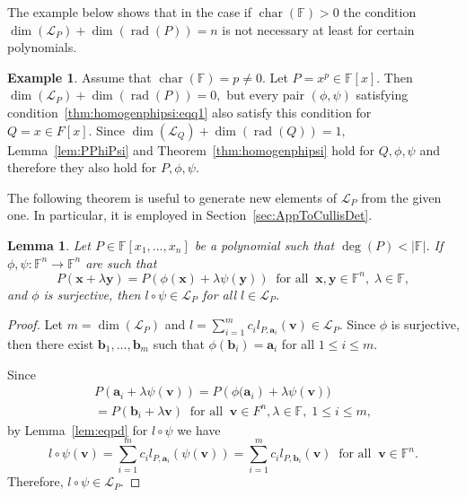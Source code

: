 \documentclass{elsarticle}
\DeclareMathOperator{\Char}{char}
\DeclareMathOperator{\rad}{rad}
\def\F{{\mathbb F}}
\newtheorem{lemma}[theorem]{Lemma}
\theoremstyle{definition}
\newtheorem{example}[theorem]{Example}
\numberwithin{equation}{section}
\begin{document}
The example below shows that in the case if $\Char (\F) > 0$ the condition $\dim (\mathcal L_P) + \dim (\rad(P)) = n$ is not necessary at least for certain polynomials.

\begin{example}\label{ex:conditionsretained}Assume that $\Char (\F) = p \neq 0$. Let $P = x^p \in \F[x].$ Then $\dim (\mathcal L_P) + \dim (\rad(P)) = 0,$ but every pair $(\phi, \psi)$ satisfying condition~\ref{thm:homogenphipsi:eqq1} also satisfy this condition for $Q = x \in F[x].$ Since $\dim (\mathcal L_Q) + \dim (\rad(Q)) = 1,$ Lemma~\ref{lem:PPhiPsi} and Theorem~\ref{thm:homogenphipsi} hold for $Q, \phi, \psi$ and therefore they also hold for $P, \phi, \psi.$
\end{example}


The following theorem is useful to generate new elements of $\mathcal L_P$ from the given one. In particular, it is employed in Section~\ref{sec:AppToCullisDet}.%

\begin{lemma}\label{thm:surjpres}Let $P \in \F[x_1,\ldots, x_n]$ be a polynomial such that $\deg (P) < |\F|$. If  $\phi, \psi \colon \F^n \to \F^n$ are such that
\begin{equation*}
P(\mathbf{x} + \lambda \mathbf{y}) = P(\phi(\mathbf{x}) + \lambda \psi(\mathbf{y}))\;\;\mbox{for all}\;\;\mathbf{x},\mathbf{y} \in \mathbb \F^n,\; \lambda \in \F,
\end{equation*}
and $\phi$ is surjective, then $l \circ \psi \in \mathcal L_P$ for all $l \in \mathcal L_P.$
\end{lemma}

\begin{proof}Let $m = \dim(\mathcal L_P)$ and $l = \sum_{i=1}^m c_i l_{P, \mathbf a_i}(\mathbf{v}) \in \mathcal L_P.$ Since $\phi$ is surjective, then there exist $\mathbf{b}_1, \ldots, \mathbf{b}_m$ such that $\phi (\mathbf{b}_i) = \mathbf{a}_i$ for all $1 \le i \le m.$

Since
\begin{multline*}
P(\mathbf a_i + \lambda \psi(\mathbf v)) = P(\phi \mathbf (\mathbf a_i) + \lambda \psi (\mathbf v))\\
 = P(\mathbf b_i + \lambda \mathbf v)\;\;\mbox{for all}\;\;\mathbf v \in F^n, \lambda \in \F,\;1 \le i \le m,
\end{multline*}
 by Lemma~\ref{lem:eqpd} for $l \circ \psi$ we have
\[
l\circ \psi(\mathbf v) = \sum_{i=1}^m c_i l_{P,\mathbf a_i}(\psi (\mathbf v)) = \sum_{i=1}^m c_i l_{P,\mathbf b_i}(\mathbf v)\;\;\mbox{for all}\;\;\mathbf v \in \F^n. 
\]
Therefore, $l\circ \psi \in \mathcal L_P.$
\end{proof}
\end{document}
